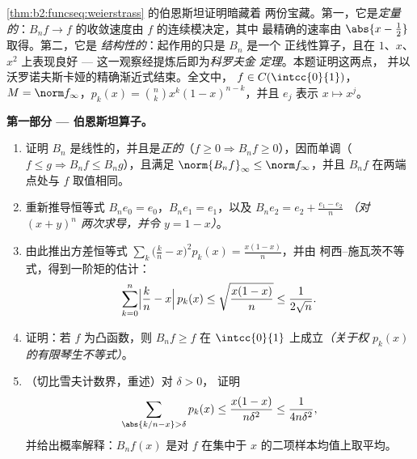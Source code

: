 \begin{problem}\label{pb:b2:funcseq:1}
\cref{thm:b2:funcseq:weierstrass} 的伯恩斯坦证明暗藏着
两份宝藏。第一，它是\emph{定量的}：$B_nf
\to f$ 的收敛速度由 $f$ 的连续模决定，其中
最精确的速率由 $\abs{x - \frac12}$ 取得。第二，它是
\emph{结构性的}：起作用的只是 $B_n$ 是一个
正线性算子，且在 $1$、$x$、$x^2$ 上表现良好 ---
这一观察经提炼后即为\emph{科罗夫金
定理}。本题证明这两点，
并以沃罗诺夫斯卡娅的精确渐近式结束。全文中，
$f \in C(\intcc{0}{1})$，$M = \norm f_\infty$，$p_k(x) = \binom
nk x^k(1-x)^{n-k}$，并且 $e_j$ 表示 $x \mapsto x^j$。

\medskip
\noindent\textbf{第一部分 --- 伯恩斯坦算子。}
\begin{enumerate}
  \item 证明 $B_n$ 是线性的，并且是\emph{正的}（$f \geq 0
        \Rightarrow B_nf \geq 0$），因而单调（$f \leq g
        \Rightarrow B_nf \leq B_ng$），且满足
        $\norm{B_nf}_\infty \leq \norm f_\infty$，并且
        $B_nf$ 在两端点处与 $f$ 取值相同。
  \item 重新推导恒等式 $B_n e_0 = e_0$，$B_n e_1 =
        e_1$，以及 $B_n e_2 = e_2 + \frac{e_1 - e_2}{n}$
        \emph{（对 $(x + y)^n$ 两次求导，并令 $y = 1 -
        x$）}。
  \item 由此推出方差恒等式 $\sum_k \bigl(\frac kn -
        x\bigr)^2 p_k(x) = \frac{x(1-x)}{n}$，并由
        柯西–施瓦茨不等式，得到一阶矩的估计：
        \[
        \sum_{k=0}^{n}\Bigl|\frac kn - x\Bigr|\,p_k(x)
        \leq \sqrt{\frac{x(1-x)}{n}} \leq \frac{1}{2\sqrt n} .
        \]
  \item 证明：若 $f$ 为凸函数，则 $B_nf \geq f$ 在
        $\intcc{0}{1}$ 上成立\emph{（关于权
        $p_k(x)$ 的有限琴生不等式）}。
  \item （切比雪夫计数界，重述）对 $\delta > 0$，
        证明
        \[
        \sum_{\abs{k/n - x} > \delta} p_k(x)
        \leq \frac{x(1-x)}{n\delta^2}
        \leq \frac{1}{4n\delta^2} ,
        \]
        并给出概率解释：$B_nf(x)$ 是对
        $f$ 在集中于 $x$ 的二项样本均值上取平均。
\end{enumerate}


\end{problem}
